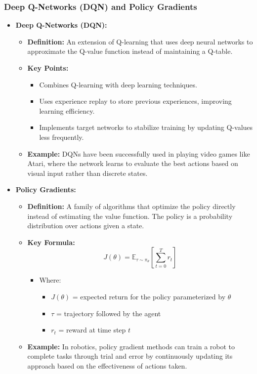 \documentclass[aspectratio=169]{beamer}
\begin{document}
\begin{frame}[fragile]
    \frametitle{Deep Q-Networks (DQN) and Policy Gradients}
    \begin{itemize}
        \item \textbf{Deep Q-Networks (DQN):}
        \begin{itemize}
            \item \textbf{Definition:} An extension of Q-learning that uses deep neural networks to approximate the Q-value function instead of maintaining a Q-table. 
            \item \textbf{Key Points:}
            \begin{itemize}
                \item Combines Q-learning with deep learning techniques.
                \item Uses experience replay to store previous experiences, improving learning efficiency.
                \item Implements target networks to stabilize training by updating Q-values less frequently.
            \end{itemize}
            \item \textbf{Example:} DQNs have been successfully used in playing video games like Atari, where the network learns to evaluate the best actions based on visual input rather than discrete states.
        \end{itemize}
        
        \item \textbf{Policy Gradients:}
        \begin{itemize}
            \item \textbf{Definition:} A family of algorithms that optimize the policy directly instead of estimating the value function. The policy is a probability distribution over actions given a state.
            \item \textbf{Key Formula:}
            \begin{equation}
                J(\theta) = \mathbb{E}_{\tau \sim \pi_\theta} \left[ \sum_{t=0}^{T} r_t \right]
            \end{equation}
            \begin{itemize}
                \item Where:
                \begin{itemize}
                    \item $J(\theta)$ = expected return for the policy parameterized by $\theta$
                    \item $\tau$ = trajectory followed by the agent
                    \item $r_t$ = reward at time step $t$
                \end{itemize}
            \end{itemize}
            \item \textbf{Example:} In robotics, policy gradient methods can train a robot to complete tasks through trial and error by continuously updating its approach based on the effectiveness of actions taken.
        \end{itemize}
    \end{itemize}
\end{frame}
\end{document}
